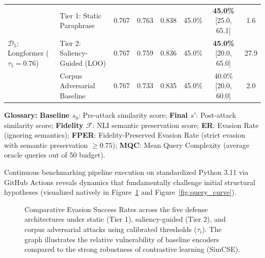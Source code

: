 \documentclass[conference,onecolumn,11pt]{IEEEtran}
\begin{document}
\begin{table}[htbp]
{\begin{tabular}{llcccccc}
\midrule
\multirow{3}{*}{$\mathcal{D}_5$: Longformer ($\tau_5=0.76$)} 
  & Tier 1: Static Paraphrase & 0.767 & 0.763 & 0.838 & 45.0\% & \textbf{45.0\%} [25.0, 65.1] & 1.6 \\
  & Tier 2: Saliency-Guided (LOO) & 0.767 & 0.759 & 0.836 & 45.0\% & \textbf{45.0\%} [20.0, 65.0] & 27.9 \\
  & Corpus Adversarial Baseline & 0.767 & 0.733 & 0.835 & 45.0\% & 40.0\% [20.0, 60.0] & 2.0 \\
\bottomrule
\end{tabular}%
}
\vspace{1em}
\small \textbf{Glossary:} \textbf{Baseline $s_0$}: Pre-attack similarity score; \textbf{Final $s'$}: Post-attack similarity score; \textbf{Fidelity $\mathcal{F}$}: NLI semantic preservation score; \textbf{ER}: Evasion Rate (ignoring semantics); \textbf{FPER}: Fidelity-Preserved Evasion Rate (strict evasion with semantic preservation $\ge 0.75$); \textbf{MQC}: Mean Query Complexity (average oracle queries out of 50 budget).
\end{table}

Continuous benchmarking pipeline execution on standardized Python 3.11 via GitHub Actions reveals dynamics that fundamentally challenge initial structural hypotheses (visualized natively in Figure~\ref{fig:tier_comparison} and Figure~\ref{fig:query_curve}). 

\begin{figure}[htbp]
\centering
{}
\caption{Comparative Evasion Success Rates across the five defense architectures under static (Tier 1), saliency-guided (Tier 2), and corpus adversarial attacks using calibrated thresholds ($\tau_i$). The graph illustrates the relative vulnerability of baseline encoders compared to the strong robustness of contrastive learning (SimCSE).}
\label{fig:tier_comparison}
\end{figure}
\end{document}
